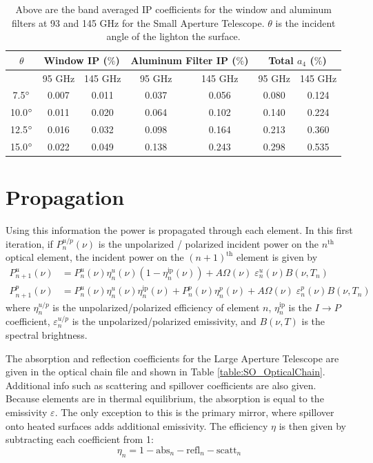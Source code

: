 \documentclass{article}
\theoremstyle{remark}
\newcommand{\tab}{\hspace*{2em}}
\renewcommand{\t}[1]{\text{#1}}
\newcommand{\ip}{$I\rightarrow P$ }
\begin{document}
\begin{table}[h]
\centering

\begin{tabular}{|c|c|c|c|c|c|c|}
\hline
$\theta $       & \multicolumn{2}{|c|}{Window IP ($\%$)} & \multicolumn{2}{|c|}{Aluminum Filter IP ($\%$)}  & \multicolumn{2}{|c|}{Total $a_4$ ($\%$)}           \\
\hline
 & 95 GHz & 145 GHz & 95 GHz & 145 GHz & 95 GHz & 145 GHz\\
 \hline
7.5$\degree$ & 0.007 & 0.011 & 0.037 & 0.056 & 0.080 & 0.124\\
10.0$\degree$ & 0.011 & 0.020 & 0.064 & 0.102 & 0.140 & 0.224\\
12.5$\degree$ & 0.016 & 0.032 & 0.098 & 0.164 & 0.213 & 0.360\\
15.0$\degree$ & 0.022 & 0.049 & 0.138 & 0.243 & 0.298 & 0.535\\
\hline
\end{tabular}
\caption{ Above are the band averaged IP coefficients for the window and aluminum filters at 93 and 145 GHz for the Small Aperture Telescope.
 $\theta$ is the incident angle of the lighton the surface.
}
\label{table:SAT_ip}
\end{table}

\section{Propagation}

\tab Using this information the power is propagated through each element.
In this first iteration, if $P_{n}^{u/p}(\nu)$ is the unpolarized / polarized incident power on the $n^\t{th}$ optical element, 
the incident power on the $(n+1)^\t{th}$ element is given by
\begin{align}
P_{n+1}^u(\nu) &= P_n^u(\nu) \eta_n^u(\nu) (1 - \eta_n^{\t{ip}}(\nu)) + A\Omega(\nu) \; \varepsilon_n^u(\nu) B(\nu,T_n)\\
P_{n+1}^p(\nu) &= P_n^u(\nu) \eta_n^u(\nu) \eta_n^{\t{ip}}(\nu) +  P_n^p(\nu) \eta_n^p(\nu) + A\Omega(\nu) \; \varepsilon_n^p(\nu) B(\nu,T_n)
\end{align}
where $\eta_n^{u/p}$ is the unpolarized/polarized efficiency of element $n$, $\eta_n^\t{ip}$ is the \ip coefficient, $\varepsilon_n^{u/p}$
is the unpolarized/polarized emissivity, and $B(\nu,T)$ is the spectral brightness.

\tab The absorption and reflection coefficients for the Large Aperture Telescope are given in the optical chain file and shown in Table 
\ref{table:SO_OpticalChain}. Additional info such as scattering and spillover coefficients are also given.
Because elements are in thermal equilibrium, the absorption is equal to the emissivity $\varepsilon$.
The only exception to this is the primary mirror, where spillover onto heated surfaces adds additional emissivity.
The efficiency $\eta$ is then given by subtracting each coefficient from 1:
\[\eta_n = 1 - \t{abs}_n - \t{refl}_n - \t{scatt}_n\]
\end{document}
